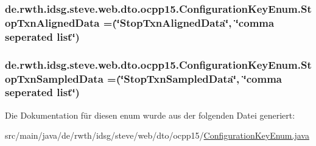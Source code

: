 \hypertarget{enumde_1_1rwth_1_1idsg_1_1steve_1_1web_1_1dto_1_1ocpp15_1_1_configuration_key_enum_a81e4a64dd31a431a1ca5b118f431e18a}{
\subsubsection[{Stop\+Txn\+Aligned\+Data}]{\setlength{\rightskip}{0pt plus 5cm}de.\+rwth.\+idsg.\+steve.\+web.\+dto.\+ocpp15.\+Configuration\+Key\+Enum.\+Stop\+Txn\+Aligned\+Data =(\char`\"{}Stop\+Txn\+Aligned\+Data\char`\"{}, \char`\"{}comma seperated list\char`\"{})}}\label{enumde_1_1rwth_1_1idsg_1_1steve_1_1web_1_1dto_1_1ocpp15_1_1_configuration_key_enum_a81e4a64dd31a431a1ca5b118f431e18a}
\hypertarget{enumde_1_1rwth_1_1idsg_1_1steve_1_1web_1_1dto_1_1ocpp15_1_1_configuration_key_enum_ac518bfd2cc29fef1a5d331b4819e72d8}{
\subsubsection[{Stop\+Txn\+Sampled\+Data}]{\setlength{\rightskip}{0pt plus 5cm}de.\+rwth.\+idsg.\+steve.\+web.\+dto.\+ocpp15.\+Configuration\+Key\+Enum.\+Stop\+Txn\+Sampled\+Data =(\char`\"{}Stop\+Txn\+Sampled\+Data\char`\"{}, \char`\"{}comma seperated list\char`\"{})}}\label{enumde_1_1rwth_1_1idsg_1_1steve_1_1web_1_1dto_1_1ocpp15_1_1_configuration_key_enum_ac518bfd2cc29fef1a5d331b4819e72d8}


Die Dokumentation für diesen enum wurde aus der folgenden Datei generiert\+:\begin{DoxyCompactItemize}
\item 
src/main/java/de/rwth/idsg/steve/web/dto/ocpp15/\hyperlink{ocpp15_2_configuration_key_enum_8java}{Configuration\+Key\+Enum.\+java}\end{DoxyCompactItemize}
